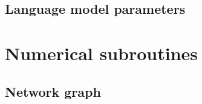 \subsection{Language model parameters}
\label{sec:nnetworkparams}

% 
% 
\section{Numerical subroutines}
\subsection{Network graph}
\label{sec:modelcost}

% 